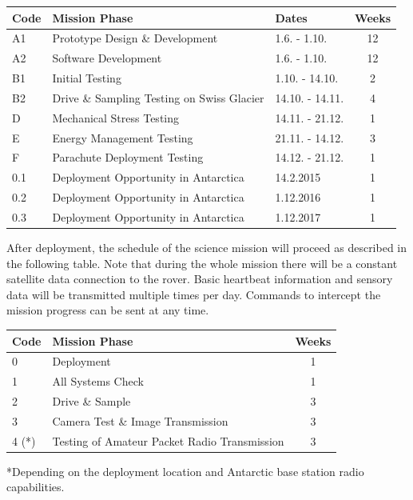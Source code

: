 \documentclass[a4paper,12pt]{article}
\begin{document}
\begin{table}[h!]
\begin{tabular}{ l | l | l | c }

\bfseries{Code} & \bfseries{Mission Phase} & \bfseries{Dates} & \bfseries{Weeks} \\
\hline
A1 & Prototype Design \& Development & 1.6. - 1.10. & 12 \\
A2 & Software Development & 1.6. - 1.10. & 12 \\
B1 & Initial Testing & 1.10. - 14.10. & 2  \\
B2 & Drive \& Sampling Testing on Swiss Glacier & 14.10. - 14.11. & 4 \\
D & Mechanical Stress Testing & 14.11. - 21.12. & 1 \\
E & Energy Management Testing & 21.11. - 14.12. & 3 \\
F & Parachute Deployment Testing & 14.12. - 21.12. & 1 \\
0.1 & Deployment Opportunity in Antarctica & 14.2.2015 &  1 \\
0.2 & Deployment Opportunity in Antarctica & 1.12.2016 &  1 \\
0.3 & Deployment Opportunity in Antarctica & 1.12.2017 &  1 \\

\end{tabular}
\end{table}

After deployment, the schedule of the science mission will proceed as described in the following table. Note that during the whole mission there will be a constant satellite data connection to the rover. Basic heartbeat information and sensory data will be transmitted multiple times per day. Commands to intercept the mission progress can be sent at any time.


\begin{table}[h!]
\begin{tabular}{ l | l | c }
\bfseries{Code} & \bfseries{Mission Phase} & \bfseries{Weeks} \\
\hline

0 & Deployment & 1 \\
1 & All Systems Check & 1 \\
2 & Drive \& Sample & 3 \\
3 & Camera Test \& Image Transmission & 3 \\
4 (*)& Testing of Amateur Packet Radio Transmission  & 3 \\

\end{tabular}
\end{table}
*Depending on the deployment location and Antarctic base station radio capabilities.
\end{document}
